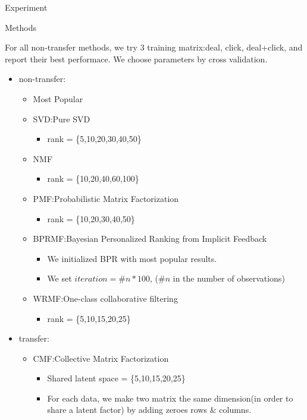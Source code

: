 \begin{section}{Experiment}
\begin{subsection}{Methods}
\par{
  For all non-transfer methods, we try 3 training matrix:{deal, click, deal+click}, and report their best performace. We choose parameters by cross validation.
  \begin{itemize}
  \item non-transfer:
    \begin{itemize}
    \item Most Popular
    \item SVD:Pure SVD
      \begin{itemize}
      \item rank = \{5,10,20,30,40,50\}
      \end{itemize}
    \item NMF
      \begin{itemize}
      \item rank = \{10,20,40,60,100\}
      \end{itemize}
    \item PMF:Probabilistic Matrix Factorization 
      \begin{itemize}
      \item rank = \{10,20,30,40,50\}
      \end{itemize}
    \item BPRMF:Bayesian Personalized Ranking from Implicit Feedback
      \begin{itemize}
      \item We initialized BPR with most popular results.
      \item We set $iteration = \#n * 100$, ($\#n$ in the number of observations)
      \end{itemize}
    \item WRMF:One-class collaborative filtering
      \begin{itemize}
      \item rank = \{5,10,15,20,25\}
      \end{itemize}
    \end{itemize}
  \item transfer:
    \begin{itemize}
    \item CMF:Collective Matrix Factorization
      \begin{itemize}
      \item Shared latent space = \{5,10,15,20,25\}
      \item For each data, we make two matrix the same dimension(in order to share a latent factor) by adding zeroes rows \& columns.
      \end{itemize}

\end{itemize}
\end{itemize}}
\end{subsection}
\end{section}
